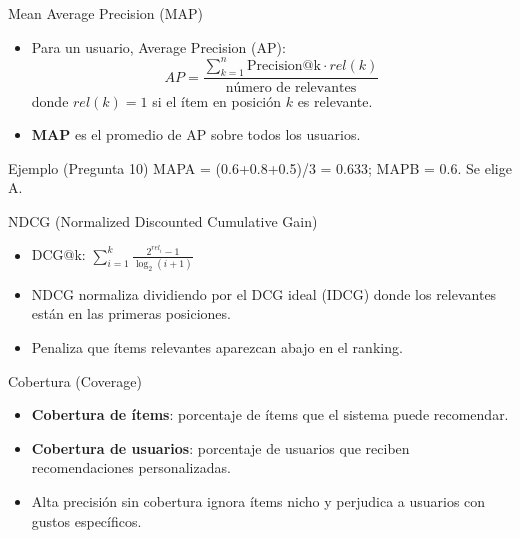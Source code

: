 \documentclass[aspectratio=169, 10pt, xcolor=table]{beamer}
\begin{document}
\begin{frame}{Mean Average Precision (MAP)}
    \begin{itemize}
        \item Para un usuario, Average Precision (AP):
        \[
        AP = \frac{\sum_{k=1}^{n} \text{Precision@k} \cdot rel(k)}{\text{número de relevantes}}
        \]
        donde $rel(k)=1$ si el ítem en posición $k$ es relevante.
        \item \textbf{MAP} es el promedio de AP sobre todos los usuarios.
    \end{itemize}
    \begin{exampleblock}{Ejemplo (Pregunta 10)}
        MAPA = (0.6+0.8+0.5)/3 = 0.633; MAPB = 0.6. Se elige A.
    \end{exampleblock}
\end{frame}

\begin{frame}{NDCG (Normalized Discounted Cumulative Gain)}
    \begin{itemize}
        \item DCG@k: $\displaystyle \sum_{i=1}^{k} \frac{2^{rel_i} - 1}{\log_2(i+1)}$
        \item NDCG normaliza dividiendo por el DCG ideal (IDCG) donde los relevantes están en las primeras posiciones.
        \item Penaliza que ítems relevantes aparezcan abajo en el ranking.
    \end{itemize}
\end{frame}

\begin{frame}{Cobertura (Coverage)}
    \begin{itemize}
        \item \textbf{Cobertura de ítems}: porcentaje de ítems que el sistema puede recomendar.
        \item \textbf{Cobertura de usuarios}: porcentaje de usuarios que reciben recomendaciones personalizadas.
        \item Alta precisión sin cobertura ignora ítems nicho y perjudica a usuarios con gustos específicos.
    \end{itemize}
\end{frame}

\end{document}
